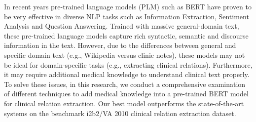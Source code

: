 In recent years pre-trained language models (PLM) such as BERT have proven to be very effective in diverse NLP tasks such as Information Extraction, Sentiment Analysis and Question Answering. Trained with massive general-domain text, these pre-trained language models capture rich syntactic, semantic and discourse information in the text. However, due to the differences between general and specific domain text (e.g., Wikipedia versus clinic notes), these models may not be ideal for domain-specific tasks (e.g., extracting clinical relations). Furthermore, it may require additional medical knowledge to understand clinical text properly. To solve these issues,  in this research, we conduct a comprehensive examination of different techniques to add medical knowledge into a pre-trained BERT model for clinical relation extraction. Our best model outperforms the state-of-the-art systems on the benchmark i2b2/VA 2010 clinical relation extraction dataset.
